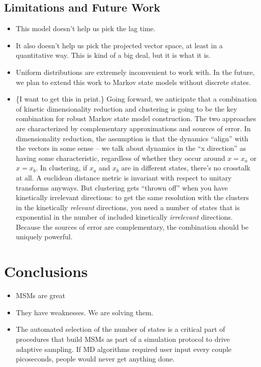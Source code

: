 \documentclass[twocolumn,floatfix,nofootinbib,aps]{revtex4-1}
\begin{document}
\subsection{Limitations and Future Work}

\begin{itemize}
\item This model doesn't help us pick the lag time.
\item It also doesn't help us pick the projected vector space, at least in a quantitative way. This is kind of a big deal, but it is what it is.
\item Uniform distributions are extremely inconvenient to work with. In the future, we plan to extend this work to Markov state models without discrete states.
\item \{I want to get this in print.\} Going forward, we anticipate that a combination of kinetic dimensionality reduction and clustering is going to be the key combination for robust Markov state model construction. The two approaches are characterized by complementary approximations and sources of error. In dimensionality reduction, the assumption is that the dynamics ``align'' with the vectors in some sense -- we talk about dynamics in the ``x direction'' as having some characteristic, regardless of whether they occur around $x=x_a$ or $x=x_b$. In clustering, if $x_a$ and $x_b$ are in different states, there's no crosstalk at all. A euclidean distance metric is invariant with respect to unitary transforms anyways. But clustering gets ``thrown off'' when you have kinetically irrelevant directions: to get the same resolution with the clusters in the kinetically \emph{relevant} directions, you need a number of states that is exponential in the number of included kinetically \emph{irrelevant} directions. Because the sources of error are complementary, the combination should be uniquely powerful.
\end{itemize}


\section{Conclusions}
\begin{itemize}
    \item MSMs are great
    \item They have weaknesses. We are solving them.
    \item The automated selection of the number of states is a critical part of procedures that build MSMs as part of a simulation protocol to drive adaptive sampling. If MD algorithms required user input every couple picoseconds, people would never get anything done.
\end{itemize}


\end{document}
